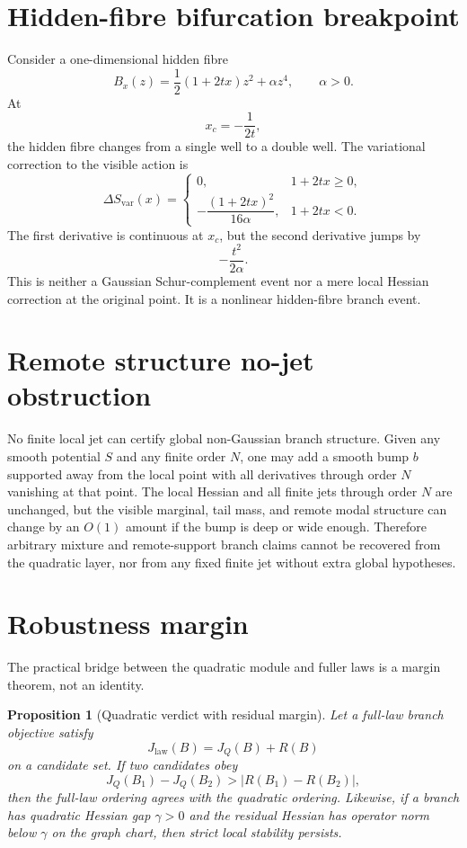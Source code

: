 \documentclass[11pt,a4paper]{article}
\numberwithin{equation}{section}
\theoremstyle{thmcompact}
\newtheorem{proposition}[theorem]{Proposition}
\theoremstyle{remark}
\begin{document}
\section{Hidden-fibre bifurcation breakpoint}

Consider a one-dimensional hidden fibre
\[
B_x(z)=\frac12(1+2tx)z^2+\alpha z^4,\qquad \alpha>0.
\]
At
\[
x_c=-\frac1{2t},
\]
the hidden fibre changes from a single well to a double well. The variational correction to the visible action is
\begin{equation}
\Delta S_{\mathrm{var}}(x)=
\begin{cases}
0, & 1+2tx\ge0,\\[0.5ex]
-\dfrac{(1+2tx)^2}{16\alpha}, & 1+2tx<0.
\end{cases}
\label{eq:hidden-fibre-bifurcation}
\end{equation}
The first derivative is continuous at $x_c$, but the second derivative jumps by
\begin{equation}
-\frac{t^2}{2\alpha}.
\label{eq:fibre-jump}
\end{equation}
This is neither a Gaussian Schur-complement event nor a mere local Hessian correction at the original point. It is a nonlinear hidden-fibre branch event.

\section{Remote structure no-jet obstruction}

No finite local jet can certify global non-Gaussian branch structure. Given any smooth potential $S$ and any finite order $N$, one may add a smooth bump $b$ supported away from the local point with all derivatives through order $N$ vanishing at that point. The local Hessian and all finite jets through order $N$ are unchanged, but the visible marginal, tail mass, and remote modal structure can change by an $O(1)$ amount if the bump is deep or wide enough. Therefore arbitrary mixture and remote-support branch claims cannot be recovered from the quadratic layer, nor from any fixed finite jet without extra global hypotheses.

\section{Robustness margin}

The practical bridge between the quadratic module and fuller laws is a margin theorem, not an identity.

\begin{proposition}[Quadratic verdict with residual margin]
Let a full-law branch objective satisfy
\[
J_{\mathrm{law}}(B)=J_Q(B)+R(B)
\]
on a candidate set. If two candidates obey
\[
J_Q(B_1)-J_Q(B_2)>|R(B_1)-R(B_2)|,
\]
then the full-law ordering agrees with the quadratic ordering. Likewise, if a branch has quadratic Hessian gap $\gamma>0$ and the residual Hessian has operator norm below $\gamma$ on the graph chart, then strict local stability persists.
\end{proposition}
\end{document}
